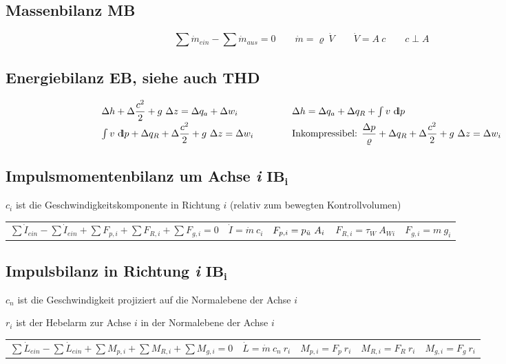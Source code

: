 \subsection{Massenbilanz MB}
	\skipabove{-15pt}
	\[
		\sum \dot{m}_{ein} - \sum \dot{m}_{aus} = 0
		\qquad  \dot{m} = \varrho\ \dot{V}
		\qquad  \dot{V} = A\ c
		\qquad  c \perp A
 	\]

\subsection{Energiebilanz EB, siehe auch THD}
	\skipabove{-15pt}
	\[ \arraycolsep=0em\def\arraystretch{1.7}
	\begin{array}{l p{4em} l}
		\Delta h + \Delta \dfrac{c^2}{2} + g\ \Delta z = \Delta q_a + \Delta w_i     & & \Delta h = \Delta q_a + \Delta q_R + \int v\ \dd p                                                         \\
		\int v\ \dd p + \Delta q_R + \Delta \dfrac{c^2}{2} + g\ \Delta z = \Delta w_i& & \text{Inkompressibel: } \dfrac{\Delta p}{\varrho} + \Delta q_R + \Delta \dfrac{c^2}{2} + g\ \Delta z = \Delta w_i
	\end{array} \]

\clearpage
\subsection{Impulsmomentenbilanz um Achse \textit{i} $\mathbf{IB_i}$ }
	$ c_i $ ist die Geschwindigkeitskomponente in Richtung $ i $ (relativ zum bewegten Kontrollvolumen)
%
	\begin{center}
		\setlength{\tabcolsep}{0.65em} %
		\begin{tabular}{lllll}
			  $ \sum \dot{I}_{ein} - \sum \dot{I}_{ein} + \sum F_{p,i} + \sum F_{R,i} + \sum F_{g,i} = 0$
			& $ \dot{I} = \dot{m} \ c_i $
			& $ F_{p,i} = p_{\ddot{u}} \ A_i $
			& $ F_{R,i} = \tau_W \ A_{Wi} $
			& $ F_{g,i} = m \ g_i $
		\end{tabular}
	\end{center}

\subsection{Impulsbilanz in Richtung \textit{i} $\mathbf{IB_i}$ }
	$ c_n $ ist die Geschwindigkeit projiziert auf die Normalebene der Achse $ i $

	$ r_i $ ist der Hebelarm zur Achse $ i $ in der Normalebene der Achse $ i $
%
	\begin{center}
		\setlength{\tabcolsep}{0.36em} %
		\begin{tabular}{lllll}
			$ \sum \dot{L}_{ein} - \sum \dot{L}_{ein} + \sum M_{p,i} + \sum M_{R,i} + \sum M_{g,i} = 0$
			& $ \dot{L} = \dot{m} \ c_n \ r_i $
			& $ M_{p,i} = F_p\ r_i $
			& $ M_{R,i} = F_R\ r_i $
			& $ M_{g,i} = F_g\ r_i $
		\end{tabular}
	\end{center}

